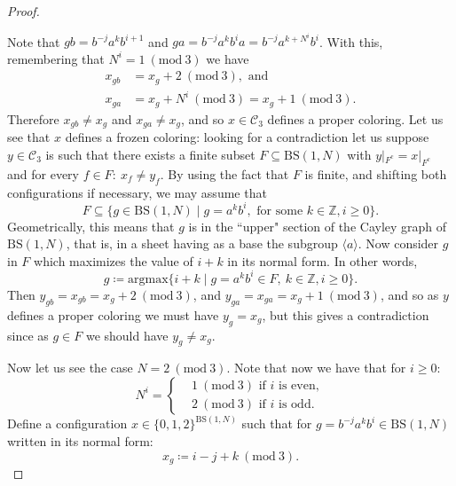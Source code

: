 \documentclass[letterpaper,10pt]{article}
\theoremstyle{plain}
\newcommand{\BS}[1][N]{\mathrm{BS}(1,#1)}
\begin{document}
\begin{proof}
\begin{figure}[H]
	\end{figure}	
	
	Note that $gb=b^{-j}a^k b^{i+1}$ and $ga=b^{-j}a^k b^ia=b^{-j}a^{k+N^i}b^i$. With this, remembering that $N^i =1 \ (\mathrm{mod} \ 3)$ we have
	\begin{align*}
	x_{gb}&=x_g+2 \ (\mathrm{mod} \ 3), \text{ and} \\
	x_{ga}&=x_g+N^i \ (\mathrm{mod} \ 3) =x_g+1 \ (\mathrm{mod} \ 3).
	\end{align*}
	Therefore $x_{gb}\neq x_g$ and $x_{ga}\neq x_g$, and so $x\in \mathcal{C}_3$ defines a proper coloring. Let us see that $x$ defines a frozen coloring: looking for a contradiction let us suppose $y\in \mathcal{C}_3$ is such that there exists a finite subset $F\subseteq \BS$ with $y|_{F^ c}=x|_{F^c}$ and for every $f\in F: \ x_f\neq y_f$. By using the fact that $F$ is finite, and shifting both configurations if necessary, we may assume that $$F\subseteq \{g\in \BS\mid g=a^kb^i, \text{ for some }k\in \mathbb{Z}, i\ge 0\}.$$ 
	Geometrically, this means that $g$ is in the ``upper" section of the Cayley graph of $\BS$, that is, in a sheet having as a base the subgroup $\langle a\rangle$. Now consider $g$ in $F$ which maximizes the value of $i+k$ in its normal form. In other words,
	$$
	g\coloneqq \mathrm{argmax}\{i+k\mid g=a^kb^i\in F, \ k\in \mathbb{Z}, i\ge 0 \}.
	$$
	Then $y_{gb}=x_{gb}=x_g+2\ (\mathrm{mod} \ 3)$, and $y_{ga}=x_{ga}=x_g+1\ (\mathrm{mod} \ 3)$, and so as $y$ defines a proper coloring we must have $y_g=x_g$, but this gives a contradiction since as $g\in F$ we should have $y_g\neq x_g$.
	
	
	Now let us see the case $N=2\ (\mathrm{mod} \ 3)$. Note that now we have that for $i\ge 0$:
	\begin{equation*}	
	N^i=\left\{ 
	\begin{aligned}
	&1 \ (\mathrm{mod} \ 3) \text{ if }i\text{ is even}, \\
	&2 \ (\mathrm{mod} \ 3) \text{ if }i\text{ is odd.} 
	\end{aligned}
	\right.
	\end{equation*}
	Define a configuration  $x\in \{0,1,2\}^{\BS}$ such that for $g=b^{-j}a^k b^i\in \BS$ written in its normal form:
	$$
	x_g\coloneqq i-j+k \ (\mathrm{mod} \ 3).
	$$
	

\end{proof}
\end{document}
